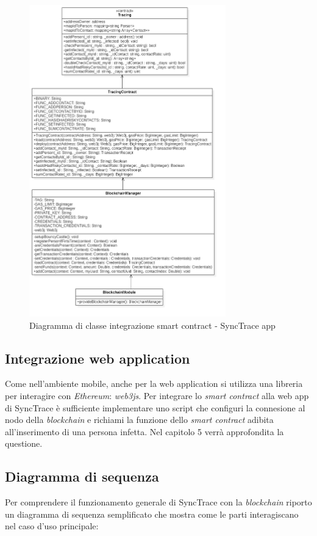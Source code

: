 \begin{figure}[h]
\label{fig:umlapp}
\caption{Diagramma di classe integrazione smart contract - SyncTrace app}
\centering
\includegraphics[width=0.76\textwidth]{./immagini/tracinguml.png}
\end{figure}

\FloatBarrier

\subsection{Integrazione web application}
Come nell'ambiente mobile, anche per la web application si utilizza una libreria per interagire con \textit{Ethereum}: \textit{web3js}. 
Per integrare lo \textit{smart contract} alla web app di SyncTrace è sufficiente implementare uno script che configuri la connesione al nodo della \textit{blockchain} e richiami la funzione dello \textit{smart contract} adibita all'inserimento di una persona infetta.
Nel capitolo 5 verrà approfondita la questione.

\subsection{Diagramma di sequenza}
Per comprendere il funzionamento generale di SyncTrace con la \textit{blockchain} riporto un diagramma di sequenza semplificato che mostra come le parti interagiscano nel caso d'uso principale:

